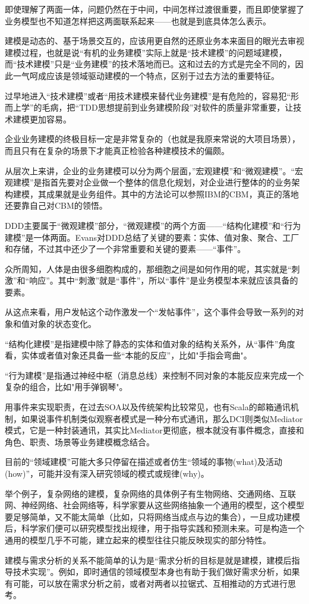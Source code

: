 即使理解了两面一体，问题仍然在于中间，中间怎样过渡很重要，而且即使掌握了业务模型也不知道怎样把这两面联系起来——也就是到底具体怎么表示。


建模是动态的、基于场景交互的，应该用更自然的还原业务本来面目的眼光去审视建模过程，也就是说“有机的业务建模”实际上就是“技术建模”的问题域建模，而“技术建模”只是“业务建模”的技术落地而已。这和过去的方式是完全不同的，因此一气呵成应该是领域驱动建模的一个特点，区别于过去方法的重要特征。

过早地进入“技术建模”或者“用技术建模来替代业务建模”是有危险的，容易犯“形而上学”的毛病，把“TDD思想提前到业务建模阶段”对软件的质量非常重要，让技术建模更加容易。


企业业务建模的终极目标一定是非常复杂的（也就是我原来常说的大项目场景），而且只有在复杂的场景下才能真正检验各种建模技术的偏颇。


从层次上来讲，企业的业务建模可以分为两个层面，”宏观建模”和“微观建模”。“宏观建模”是指首先要对企业做一个整体的信息化规划，对企业进行整体的的业务架构建模，其成果就是业务组件。其中的方法论可以参照IBM的CBM，真正的落地还要靠自己对CBM的领悟。

DDD主要属于“微观建模”部分，“微观建模”的两个方面——“结构化建模”和“行为建模”是一体两面。Evans对DDD总结了关键的要素：实体、值对象、聚合、工厂和存储，不过其中还少了一个非常重要和关键的要素——“事件”。

众所周知，人体是由很多细胞构成的，那细胞之间是如何作用的呢，其实就是“刺激”和“响应”。其中“刺激”就是“事件”，所以“事件”是业务模型本来就应该具备的要素。

从这点来看，用户发帖这个动作激发一个“发帖事件”，这个事件会导致一系列的对象和值对象的状态变化。

\begin{compactitem}
\item “结构化建模”是指建模中除了静态的实体和值对象的结构关系外，从“事件”角度看，实体或者值对象还具备一些“本能的反应”，比如"手指会弯曲"。
\item “行为建模”是指通过神经中枢（消息总线）来控制不同对象的本能反应来完成一个复杂的组合，比如"用手弹钢琴"。
\end{compactitem}

用事件来实现职责，在过去SOA以及传统架构比较常见，也有Scala的邮箱通讯机制，如果说事件机制类似观察者模式是一种分布式通讯，那么DCI则类似Mediator模式，它是一种封装通讯，其实比Mediator更彻底，根本就没有事件概念，直接和角色、职责、场景等业务建模概念结合。



目前的“领域建模”可能大多只停留在描述或者仿生“领域的事物(what)及活动(how)”，可能并没有深入研究领域的模式或规律(why)。


举个例子，复杂网络的建模，复杂网络的具体例子有生物网络、交通网络、互联网、神经网络、社会网络等，科学家要从这些网络抽象一个通用的模型，这个模型要足够简单，又不能太简单（比如，只将网络当成点与边的集合），一旦成功建模后，科学家们便可以研究模型找出规律，用于指导实践和预测未来。可是构造一个通用的模型几乎不可能，建立起来的模型往往只能反映现实的部分特性。


建模与需求分析的关系不能简单的认为是“需求分析的目标是就是建模，建模后指导技术实现”。例如，即时通信的领域模型本身也有助于我们做好需求分析，如果有可能，可以放在需求分析之前，或者对两者以拉锯式、互相推动的方式进行思考。

